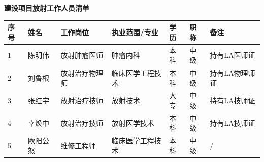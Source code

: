 \vspace{10mm}
\begin{center}
\songti
\setlength{\tabrestwidth}{\dimexpr\textwidth - 2.0cm - 12\tabcolsep - 8\arrayrulewidth\relax}
\textbf{建设项目放射工作人员清单}\par\vspace{2mm}
\begin{tabular}{|p{2.0cm}|p{}|p{}|p{}|p{}|p{}|p{}|}
\hline
\raggedright 序号 & \raggedright 姓名 & \raggedright 工作岗位 & \raggedright 执业范围/专业 & \raggedright 学历 & \raggedright 职称 & \raggedright 备注 \\
\hline
\raggedright 1 & \raggedright 陈明伟 & \raggedright 放射肿瘤医师 & \raggedright 肿瘤内科 & \raggedright 本科 & \raggedright 中级 & \raggedright 持有LA医师证 \\
\hline
\raggedright 2 & \raggedright 刘鲁根 & \raggedright 放射治疗物理师 & \raggedright 临床医学工程技术 & \raggedright 本科 & \raggedright 中级 & \raggedright 持有LA物理师证 \\
\hline
\raggedright 3 & \raggedright 张红宇 & \raggedright 放射治疗技师 & \raggedright 放射技术 & \raggedright 大专 & \raggedright 中级 & \raggedright 持有LA技师证 \\
\hline
\raggedright 4 & \raggedright 幸焕中 & \raggedright 放射治疗技师 & \raggedright 放射医学技术 & \raggedright 本科 & \raggedright 中级 & \raggedright 持有LA技师证 \\
\hline
\raggedright 5 & \raggedright 欧阳公怒 & \raggedright 维修工程师 & \raggedright 临床医学工程技术 & \raggedright 本科 & \raggedright 中级 & \raggedright / \\
\hline
\end{tabular}
\end{center}



